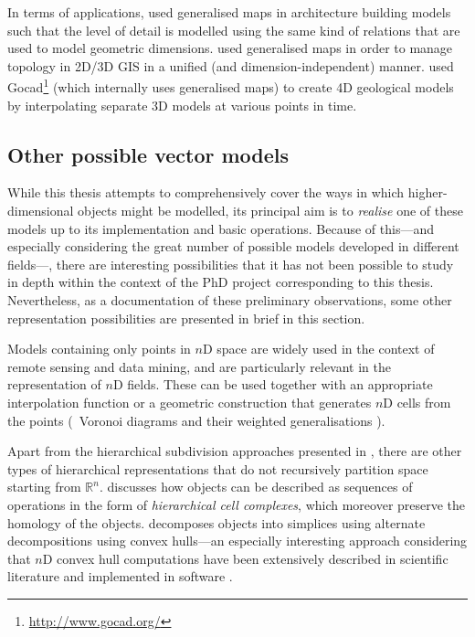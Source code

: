 In terms of applications, 
\citet{Fradin02} used generalised maps in architecture building models such that the level of detail is modelled using the same kind of relations that are used to model geometric dimensions.
\citet{Thomsen08} used generalised maps in order to manage topology in 2D/3D GIS in a unified (and dimension-independent) manner.
\citet{Le13} used Gocad\footnote{\url{http://www.gocad.org/}} (which internally uses generalised maps) to create 4D geological models by interpolating separate 3D models at various points in time.

\subsection{Other possible vector models}
\label{ss:vector-others}

While this thesis attempts to comprehensively cover the ways in which higher-dimensional objects might be modelled, its principal aim is to \emph{realise} one of these models up to its implementation and basic operations.
Because of this---and especially considering the great number of possible models developed in different fields---, there are interesting possibilities that it has not been possible to study in depth within the context of the PhD project corresponding to this thesis.
Nevertheless, as a documentation of these preliminary observations, some other representation possibilities are presented in brief in this section.

Models containing only points in $n$D space \citep{Pasko01} are widely used in the context of remote sensing and data mining, and are particularly relevant in the representation of $n$D fields.
These can be used together with an appropriate interpolation function \citep{Miller97} or a geometric construction that generates $n$D cells from the points (\eg\ Voronoi diagrams \citep{Ledoux06} and their weighted generalisations \citep{Edelsbrunner14}).


Apart from the hierarchical subdivision approaches presented in , there are other types of hierarchical representations that do not recursively partition space starting from $\mathbb{R}^n$.
\citet{Comic14} discusses how objects can be described as sequences of operations in the form of \emph{hierarchical cell complexes}, which moreover preserve the homology of the objects.
\citet{Bulbul09a} decomposes objects into simplices using alternate decompositions using convex hulls---an especially interesting approach considering that $n$D convex hull computations have been extensively described in scientific literature and implemented in software \citep{Lawson86,Seidel86,Barber96}.

